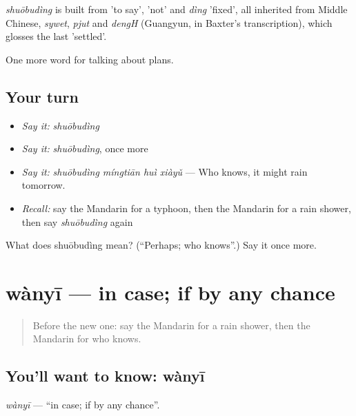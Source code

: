\begin{cousinweb}
\emph{shuōbudìng} is built from  'to say',  'not' and \emph{dìng} 'fixed', all inherited from Middle Chinese, \emph{sywet}, \emph{pjut} and \emph{dengH} (Guangyun, in Baxter's transcription), which glosses the last 'settled'.
\end{cousinweb}

\begin{grammarlens}[title={What you've built}]
One more word for talking about plans.
\end{grammarlens}

\subsection*{Your turn}
\begin{itemize}
\raggedright
  \item \emph{Say it:} \emph{shuōbudìng}
  \item \emph{Say it:} \emph{shuōbudìng}, once more
  \item \emph{Say it:} \emph{shuōbudìng míngtiān huì xiàyǔ} — Who knows, it might rain tomorrow.
  \item \emph{Recall:} say the Mandarin for a typhoon, then the Mandarin for a rain shower, then say \emph{shuōbudìng} again
\end{itemize}

\begin{tcolorbox}[breakable,colback=teal!4,colframe=teal!35!black,title={Before you move on}]
What does shuōbudìng mean? (\textquotedblleft{}Perhaps; who knows\textquotedblright{}.) Say it once more.
\end{tcolorbox}
\section[wànyī]{wànyī — in case; if by any chance}

\label{lesson:ZH-C244-wanyi}



\begin{quote}
Before the new one: say the Mandarin for a rain shower, then the Mandarin for who knows.
\end{quote}

\subsection*{You'll want to know: wànyī}
\emph{wànyī} — \textquotedblleft{}in case; if by any chance\textquotedblright{}.

